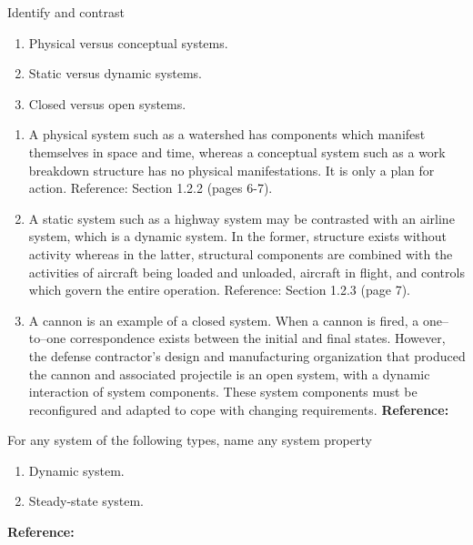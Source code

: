 \begin{exercises}
    \begin{exercise} 
    \label{sea-01-06_07_08}
        Identify and contrast
        \begin{enumerate}[label=\alph*)]
            \item Physical versus conceptual systems.
            \item Static versus dynamic systems.
            \item Closed versus open systems.
        \end{enumerate}
    \end{exercise}
    \begin{solution}
        \begin{enumerate}[label=\alph*)]
            \item A physical system such as a watershed has components which manifest themselves in space and time, whereas a conceptual system such as a work breakdown structure has no physical manifestations. It is only a plan for action. Reference: Section 1.2.2 (pages 6-7).
            \item A static system such as a highway system may be contrasted with an airline system, which is a dynamic system. In the former, structure exists without activity whereas in the latter, structural components are combined with the activities of aircraft being loaded and unloaded, aircraft in flight, and controls which govern the entire operation. Reference: Section 1.2.3 (page 7).
            \item A cannon is an example of a closed system. When a cannon is fired, a one–to–one correspondence exists between the initial and final states. However, the defense contractor’s design and manufacturing organization that produced the cannon and associated projectile is an open system, with a dynamic interaction of system components. These system components must be reconfigured and adapted to cope with changing requirements. \textbf{Reference:}
        \end{enumerate}
    \end{solution}
    
    \begin{exercise} 
    \label{sea-01-15}
        For any system of the following types, name any system property
        \begin{enumerate}[label=\alph*)]
            \item Dynamic system.
            \item Steady-state system.
        \end{enumerate}
    \end{exercise}
    \begin{solution}
        \textbf{Reference:}
    \end{solution}
    

\end{exercises}
